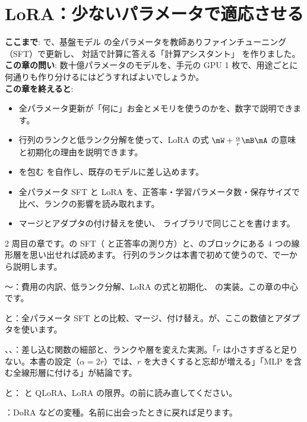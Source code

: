 \chapter{LoRA：少ないパラメータで適応させる}\label{ch:lora}

\begin{chapterlead}
\textbf{ここまで}: で、基盤モデル  の全パラメータを教師ありファインチューニング（SFT）で更新し、
対話で計算に答える「計算アシスタント」 を作りました。\\
\textbf{この章の問い}: 数十億パラメータのモデルを、手元の GPU 1 枚で、用途ごとに何通りも作り分けるにはどうすればよいでしょうか。\\[1mm]
\textbf{この章を終えると}:
\begin{itemize}
\item 全パラメータ更新が「何に」お金とメモリを使うのかを、数字で説明できます。
\item 行列のランクと低ランク分解を使って、LoRA の式 $\mW+\frac{\alpha}{r}\mB\mA$ の意味と初期化の理由を説明できます。
\item {} を包む  を自作し、既存のモデルに差し込めます。
\item 全パラメータ SFT と LoRA を、正答率・学習パラメータ数・保存サイズで比べ、ランクの影響を読み取れます。
\item マージとアダプタの付け替えを使い、 ライブラリで同じことを書けます。
\end{itemize}
\end{chapterlead}

\begin{readingguide}
\item[\rgpre] 2 周目の章です。の SFT（ と正答率の測り方）と、のブロックにある 4 つの線形層を思い出せれば読めます。
行列のランクは本書で初めて使うので、で一から説明します。
\item[\rgmust] 〜：費用の内訳、低ランク分解、LoRA の式と初期化、 の実装。この章の中心です。
\item[\rgmust] と：全パラメータ SFT との比較、マージ、付け替え。が、ここの数値とアダプタを使います。
\item[\rgskim] 、、：差し込む関数の細部と、ランクや層を変えた実測。「$r$ は小さすぎると足りない。本書の設定（$\alpha=2r$）では、$r$ を大きくすると忘却が増える」「MLP を含む全線形層に付ける」が結論です。
\item[\rgskim] と： と QLoRA、LoRA の限界。の前に読み直してください。
\item[\rglater] ：DoRA などの変種。名前に出会ったときに戻れば足ります。
\end{readingguide}

